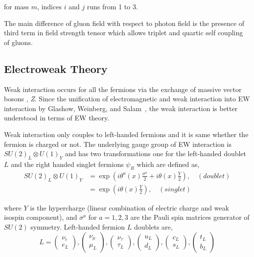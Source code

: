 for mass \( m \), indices \( i \) and \( j \) runs from 1 to 3.

The main difference of gluon field with respect to photon field is
the presence of third term in
field strength tensor which allows triplet and quartic
self coupling of gluons.

\subsection{
  Electroweak Theory
}\label{ch_intro:ew}

Weak interaction occurs for all the fermions via the exchange of
massive vector bosons \Wplusminus{}, \textit{Z}.
Since the unification of electromagnetic
and weak interaction into \gls{EW} interaction by
Glashow, Weinberg, and Salam~\cite{Glashow1959,Weinberg1967,Salam1959},
the weak interaction is better understood in terms of \gls{EW} theory.

Weak interaction only couples to left-handed fermions and it is same
whether the fermion is charged or not. The underlying gauge group of
\gls{EW} interaction is \( {SU(2)}_{L} \otimes {U(1)}_{Y} \) and
has two transformations one for the left-handed doublet
\( L \) and the right handed singlet fermions \( \psi_R \) which are defined as,
%
\begin{align}
  {SU(2)}_{L} \otimes {U(1)}_{Y} & =
  \exp \left( {i \theta^{a}(x) \frac{\sigma^a}{2}} + {i \theta(x) \frac{Y}{2}} \right)
  , \quad (doublet)                                                                \\
                                 & = \exp \left( {i \theta(x) \frac{Y}{2}} \right)
  , \quad (singlet)
\end{align}

where \( Y \) is the hypercharge (linear combination of electric charge and weak
isospin component), and \( \sigma^{a} \) for \( a = 1,2,3 \)
are the Pauli spin matrices generator of \( SU(2) \) symmetry. Left-handed
fermion \( L \) doublets are,
%
\begin{equation}
  L = \left(\begin{matrix}
    \nu_e \\
    e_L
  \end{matrix}\right) ,
  \left(\begin{matrix}
    \nu_\mu \\
    \mu_L
  \end{matrix}\right) ,
  \left(\begin{matrix}
    \nu_\tau \\
    \tau_L
  \end{matrix}\right) ,
  \left(\begin{matrix}
    u_L \\
    d_L
  \end{matrix}\right) ,
  \left(\begin{matrix}
    c_L \\
    s_L
  \end{matrix}\right) ,
  \left(\begin{matrix}
    t_L \\
    b_L
  \end{matrix}\right)
\end{equation}

